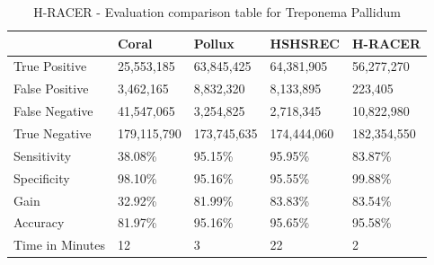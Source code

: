\documentclass[12pt,openany]{llncs}
\begin{document}
\begingroup
\renewcommand\arraystretch{2.9}
\begin{longtable}{|m{33mm}|m{20mm}|m{20mm}|m{20mm}|m{20mm}|}
	    \caption{\label{tab:eval-2}H-RACER - Evaluation comparison table for Treponema Pallidum}\\
        \hline
           & Coral & Pollux & HSHSREC & H-RACER\cellcolor{DarkGray} \\ %
        \hline
           True Positive & 25,553,185 & 63,845,425 & 64,381,905 & 56,277,270\cellcolor{LightGray} \\ %
        \hline
           False Positive & 3,462,165 & 8,832,320 & 8,133,895 & 223,405\cellcolor{LightGray} \\ %
        \hline
           False Negative & 41,547,065 & 3,254,825 & 2,718,345 & 10,822,980\cellcolor{LightGray} \\ %
        \hline
           True Negative & 179,115,790 & 173,745,635 & 174,444,060 & 182,354,550\cellcolor{LightGray} \\ %
        \hline
           Sensitivity & 38.08\% & 95.15\% & 95.95\% & 83.87\%\cellcolor{LightGray} \\ %
        \hline
           Specificity & 98.10\% &  95.16\% & 95.55\% & 99.88\%\cellcolor{LightGray} \\ %
        \hline
           Gain & 32.92\% & 81.99\% & 83.83\% & 83.54\%\cellcolor{LightGray} \\ %
        \hline
           Accuracy & 81.97\% & 95.16\% & 95.65\% & 95.58\%\cellcolor{LightGray} \\ %
        \hline
           Time in Minutes& 12 & 3 & 22 & 2\cellcolor{LightGray} \\ %
        \hline
\end{longtable}
\endgroup

\newpage
\end{document}
